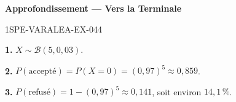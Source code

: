 \begin{center}\textbf{Approfondissement — Vers la Terminale}\end{center}
\begin{corrige}{1SPE-VARALEA-EX-044}

\textbf{1.} $X \sim \mathcal{B}(5, 0{,}03)$.

\medskip
\textbf{2.} $P(\text{accepté}) = P(X=0) = (0{,}97)^5 \approx 0{,}859$.

\medskip
\textbf{3.} $P(\text{refusé}) = 1 - (0{,}97)^5 \approx 0{,}141$, soit environ $14{,}1\,\%$.

\end{corrige}
